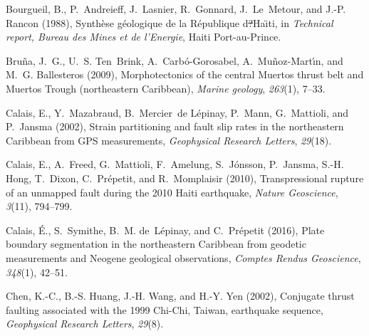 \documentclass[linenumbers,draft]{agujournal}
\providecommand{\DIFaddtex}[1]{{\protect\color{blue}\uwave{#1}}} %
\providecommand{\DIFdeltex}[1]{{\protect\color{red}\sout{#1}}}                      %
\providecommand{\DIFaddbegin}{} %
\providecommand{\DIFaddend}{} %
\providecommand{\DIFdelbegin}{} %
\providecommand{\DIFdelend}{} %
\providecommand{\DIFadd}[1]{\texorpdfstring{\DIFaddtex{#1}}{#1}} %
\providecommand{\DIFdel}[1]{\texorpdfstring{\DIFdeltex{#1}}{}} %
\begin{document}
\begin{thebibliography}{65}
Bourgueil, B., P.~Andreieff, J.~Lasnier, R.~Gonnard, J.~Le~Metour, and J.-P.
  Rancon (1988), {Synth{\`e}se g{\'e}ologique de la R{\'e}publique
  d\DIFdelbegin \DIFdel{?}\DIFdelend \DIFaddbegin \DIFadd{'}\DIFaddend Ha{\"\i}ti}, in \textit{Technical report, Bureau des Mines et de
  l'Energie}, Haiti Port-au-Prince.

Bru{\~n}a, J.~G., U.~S. Ten~Brink, A.~Carb{\'o}-Gorosabel,
  A.~Mu{\~n}oz-Mart{\'\i}n, and M.~G. Ballesteros (2009), {Morphotectonics of
  the central Muertos thrust belt and Muertos Trough (northeastern Caribbean)},
  \textit{Marine geology}, \textit{263}(1), 7--33.

Calais, E., Y.~Mazabraud, B.~Mercier~de L{\'e}pinay, P.~Mann, G.~Mattioli, and
  P.~Jansma (2002), Strain partitioning and fault slip rates in the
  northeastern {Caribbean from GPS measurements}, \textit{Geophysical Research
  Letters}, \textit{29}(18).

Calais, E., A.~Freed, G.~Mattioli, F.~Amelung, S.~J{\'o}nsson, P.~Jansma, S.-H.
  Hong, T.~Dixon, C.~Pr{\'e}petit, and R.~Momplaisir (2010), Transpressional
  rupture of an unmapped fault during the 2010 {Haiti} earthquake,
  \textit{Nature Geoscience}, \textit{3}(11), 794--799.

Calais, {\'E}., S.~Symithe, B.~M. de~L{\'e}pinay, and C.~Pr{\'e}petit (2016),
  {Plate boundary segmentation in the northeastern Caribbean from geodetic
  measurements and Neogene geological observations}, \textit{Comptes Rendus
  Geoscience}, \textit{348}(1), 42--51.

Chen, K.-C., B.-S. Huang, J.-H. Wang, and H.-Y. Yen (2002), {Conjugate thrust
  faulting associated with the 1999 Chi-Chi, Taiwan, earthquake sequence},
  \textit{Geophysical Research Letters}, \textit{29}(8).


\end{thebibliography}
\end{document}

